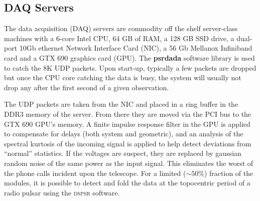 \subsection {DAQ Servers}

The data acquisition (DAQ) servers are commodity off the shelf server-class machines with a 6-core Intel CPU, 64 GB of RAM, a 128 GB SSD drive, a dual-port 10Gb ethernet Network Interface Card (NIC), a 56 Gb Mellanox Infiniband card and a GTX 690 graphics card (GPU). The {\bf psrdada} software library is used to catch the 8K UDP packets. Upon start-up, typically a few packets are dropped but once the CPU core catching the data is busy, the system will usually not drop any after the first second of a given observation. 

The UDP packets are taken from the NIC and placed in a ring buffer
in the DDR3 memory of the server. From there they are moved via the PCI bus to the GTX 690 GPU's memory. A finite impulse response filter in the GPU is applied to compensate for delays (both system and geometric), and an analysis of the spectral kurtosis of the incoming signal is applied to help detect deviations from ``normal'' statistics. If the voltages are suspect, they are replaced by gaussian random noise of the same power as the input signal. This eliminates the worst of the phone calls incident upon the telescope. For a limited ($\sim50$\%) fraction of the modules, it is possible to detect and fold the data at the topocentric period of a radio pulsar using the \textsc{dspsr} software.

